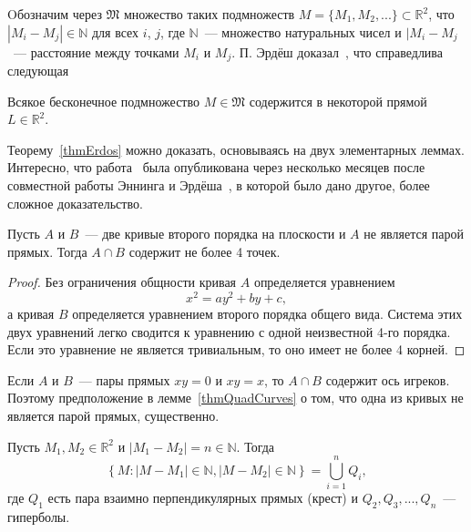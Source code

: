 Oбозначим через $\mathfrak{M}$ множество таких подмножеств
$
	M = \{M_1, M_2, ... \}\subset \mathbb{R}^2
$,
что
$
	|M_i - M_j|\in\mathbb{N}
$
для всех $i$, $j$, где $\mathbb{N}$~--- множество натуральных чисел
и $|M_i - M_j$~--- расстояние между точками $M_i$ и $M_j$.
П. Эрдёш доказал~\cite{erdos1945integral},
что справедлива следующая

\begin{theorem}
	\label{thmErdos}
	Всякое бесконечное подмножество $M\in\mathfrak{M}$
	содержится в некоторой прямой $L\in\mathbb{R}^2$.
\end{theorem}

Теорему~\ref{thmErdos} можно доказать, основываясь на двух элементарных леммах.
Интересно, что работа~\cite{erdos1945integral} была опубликована через несколько
месяцев после совместной работы Эннинга и Эрдёша~\cite{anning1945integral},
в которой было дано другое, более сложное доказательство.

\begin{lemma}
	\label{thmQuadCurves}
	Пусть $A$ и $B$~--- две кривые второго порядка на плоскости и $A$ не является парой прямых.
	Тогда $A\cap B$ содержит не более 4 точек.
\end{lemma}

\begin{proof}
	Без ограничения общности кривая $A$ определяется уравнением
	\begin{equation*}
		x^2 = ay^2 + by +c
		,
	\end{equation*}
	а кривая $B$ определяется уравнением второго порядка общего вида.
	Система этих двух уравнений легко сводится к уравнению с одной неизвестной 4-го порядка.
	Если это уравнение не является тривиальным, то оно имеет не более 4 корней.
\end{proof}

Если $A$ и $B$~--- пары прямых $xy=0$ и $xy=x$,
то $A\cap B$ содержит ось игреков.
Поэтому предположение в лемме~\ref{thmQuadCurves} о том,
что одна из кривых не является парой прямых, существенно.

\begin{lemma}
	\label{thm:quadCurveFamily}
	Пусть $M_1, M_2 \in \mathbb{R}^2$ и
	$|M_1 - M_2| = n \in \mathbb{N}$.
	Тогда
	\begin{equation}
		\label{eq:quadCurveFamily}
		\left\{
			M: |M-M_1|\in\mathbb{N}, |M-M_2|\in\mathbb{N}
		\right\}
		=\bigcup_{i=1}^n Q_i
		,
	\end{equation}
	где $Q_1$ есть пара взаимно перпендикулярных прямых (крест)
	и $Q_2, Q_3,...,Q_n$~--- гиперболы.
\end{lemma}

